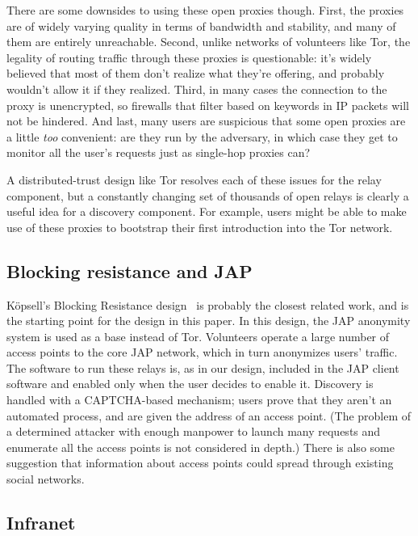 \documentclass{llncs}
\begin{document}
There are some downsides to using these open proxies though. First,
the proxies are of widely varying quality in terms of bandwidth and
stability, and many of them are entirely unreachable. Second, unlike
networks of volunteers like Tor, the legality of routing traffic through
these proxies is questionable: it's widely believed that most of them
don't realize what they're offering, and probably wouldn't allow it if
they realized. Third, in many cases the connection to the proxy is
unencrypted, so firewalls that filter based on keywords in IP packets
will not be hindered. And last, many users are suspicious that some
open proxies are a little \emph{too} convenient: are they run by the
adversary, in which case they get to monitor all the user's requests
just as single-hop proxies can?

A distributed-trust design like Tor resolves each of these issues for
the relay component, but a constantly changing set of thousands of open
relays is clearly a useful idea for a discovery component. For example,
users might be able to make use of these proxies to bootstrap their
first introduction into the Tor network.

\subsection{Blocking resistance and JAP}

K\"{o}psell's Blocking Resistance design~\cite{koepsell:wpes2004} is probably
the closest related work, and is the starting point for the design in this
paper.  In this design, the JAP anonymity system is used as a base instead of
Tor.  Volunteers operate a large number of access points to the core JAP
network, which in turn anonymizes users' traffic.  The software to run these
relays is, as in our design, included in the JAP client software and enabled
only when the user decides to enable it.  Discovery is handled with a
CAPTCHA-based mechanism; users prove that they aren't an automated process,
and are given the address of an access point.  (The problem of a determined
attacker with enough manpower to launch many requests and enumerate all the
access points is not considered in depth.)  There is also some suggestion
that information about access points could spread through existing social
networks.

\subsection{Infranet}
\end{document}
